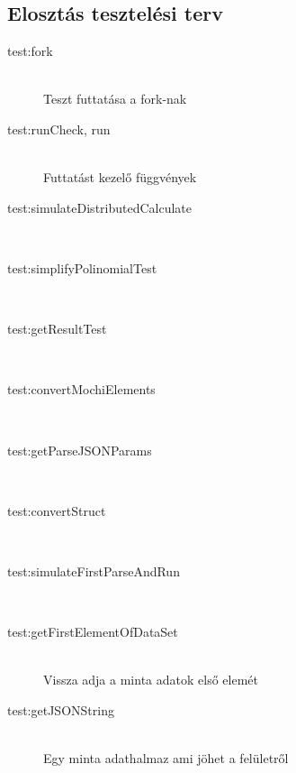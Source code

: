 \subsection{Elosztás tesztelési terv}
	\begin{description}
		\item[test:fork] \hfill \\
			Teszt futtatása a fork-nak

		\item[test:runCheck, run] \hfill \\
			Futtatást kezelő függvények 

		\item[test:simulateDistributedCalculate] \hfill \\

		\item[test:simplifyPolinomialTest] \hfill \\

		\item[test:getResultTest] \hfill \\

		\item[test:convertMochiElements] \hfill \\

		\item[test:getParseJSONParams] \hfill \\

		\item[test:convertStruct] \hfill \\
		\item[test:simulateFirstParseAndRun] \hfill \\
		\item[test:getFirstElementOfDataSet] \hfill \\
		Vissza adja a minta adatok első elemét
		\item[test:getJSONString] \hfill \\
		Egy minta adathalmaz ami jöhet a felületről
	\end{description}

